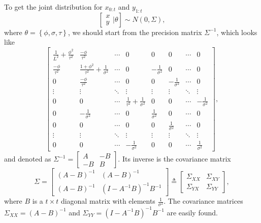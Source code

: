 To get the joint distribution for $x_{0:t}$ and $y_{1:t}$
\begin{equation*}
\left[ \begin{matrix} x\\y  \end{matrix}\bigg\rvert \theta \right]
\sim N\left(0, \Sigma  \right),
\end{equation*}
where $\theta = \left\lbrace \phi,\sigma,\tau\right\rbrace$, we should start from the precision matrix $\Sigma^{-1}$, which looks like 
\begin{equation*}
\begin{bmatrix}
\frac{1}{L^2}+\frac{\phi^2}{\tau^2} & \frac{-\phi}{\tau^2} & \cdots & 0 & 0 & 0& \cdots & 0\\
\frac{-\phi}{\tau^2}   & \frac{1+\phi^2}{\tau^2}+\frac{1}{\sigma^2}& \cdots & 0 & -\frac{1}{\sigma^2} &0 & \cdots & 0 \\
0 & \frac{-\phi}{\tau^2}   &  \cdots & 0 & 0& -\frac{1}{\sigma^2} & \cdots & 0\\
\vdots & \vdots & \ddots & \vdots & \vdots & \vdots & \ddots & \vdots \\
0 & 0   &  \cdots & \frac{1}{\tau^2}+\frac{1}{\sigma^2} & 0 & 0 & \cdots &-\frac{1}{\sigma^2}\\
0 & -\frac{1}{\sigma^2}  & \cdots & 0 & \frac{1}{\sigma^2} & 0 & \cdots & 0 \\
0& 0 & \cdots & 0 & 0 &  \frac{1}{\sigma^2} & \cdots & 0\\
\vdots & \vdots & \ddots & \vdots & \vdots & \vdots & \ddots & \vdots\\
0 & 0& \cdots &-\frac{1}{\sigma^2} & 0 & 0 & \cdots &  \frac{1}{\sigma^2}
\end{bmatrix},
\end{equation*}
and denoted as $\Sigma^{-1}=\begin{bmatrix} A & -B \\ -B & B \end{bmatrix}$. Its inverse is the covariance matrix 
\begin{equation}
\Sigma=\begin{bmatrix} (A-B)^{-1} &  (A-B)^{-1} \\ (A-B)^{-1} & (I-A^{-1}B)^{-1}B^{-1} \end{bmatrix} \triangleq \begin{bmatrix}
\Sigma_{XX} & \Sigma_{XY}  \\ \Sigma_{YX} & \Sigma_{YY} 
\end{bmatrix},
\end{equation}
where $B$ is a $t\times t$ diagonal matrix with elements $\frac{1}{\sigma^2}$. The covariance matrices $\Sigma_{XX} =  \left(A-B\right)^{-1}$ and $\Sigma_{YY}=\left(I-A^{-1}B\right)^{-1}B^{-1}$ are easily found. 




